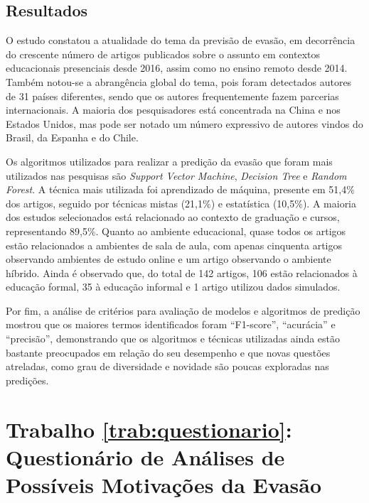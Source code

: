 \documentclass[12pt]{article}
\begin{document}
\subsection{Resultados}

O estudo constatou a atualidade do tema da previsão de evasão, em decorrência do crescente número de artigos publicados sobre o assunto em contextos educacionais presenciais desde 2016, assim como no ensino remoto desde 2014. Também notou-se a abrangência global do tema, pois foram detectados autores de 31 países diferentes, sendo que os autores frequentemente fazem parcerias internacionais. A maioria dos pesquisadores está concentrada na China e nos Estados Unidos, mas pode ser notado um número expressivo de autores vindos do Brasil, da Espanha e do Chile.

Os algoritmos utilizados para realizar a predição da evasão que foram mais utilizados nas pesquisas são \textit{Support Vector Machine}, \textit{Decision Tree} e \textit{Random Forest}. A técnica mais utilizada foi aprendizado de máquina, presente em 51,4\% dos artigos, seguido por técnicas mistas (21,1\%) e estatística (10,5\%). A maioria dos estudos selecionados está relacionado ao contexto de graduação e cursos, representando 89,5\%. Quanto ao ambiente educacional, quase todos os artigos estão relacionados a ambientes de sala de aula, com apenas cinquenta artigos observando ambientes de estudo online e um artigo observando o ambiente híbrido. Ainda é observado que, do total de 142 artigos, 106 estão relacionados à educação formal, 35 à educação informal e 1 artigo utilizou dados simulados.


Por fim, a análise de critérios para avaliação de modelos e algoritmos de predição mostrou que os maiores termos identificados foram ``F1-score'', ``acurácia'' e ``precisão'', demonstrando que os algoritmos e técnicas utilizadas ainda estão bastante preocupados em relação do seu desempenho e que novas questões atreladas, como grau de diversidade e novidade são poucas exploradas nas predições.

\section{Trabalho \ref{trab:questionario}: Questionário de Análises de Possíveis Motivações da Evasão}
\label{sec:questionario}
\end{document}
